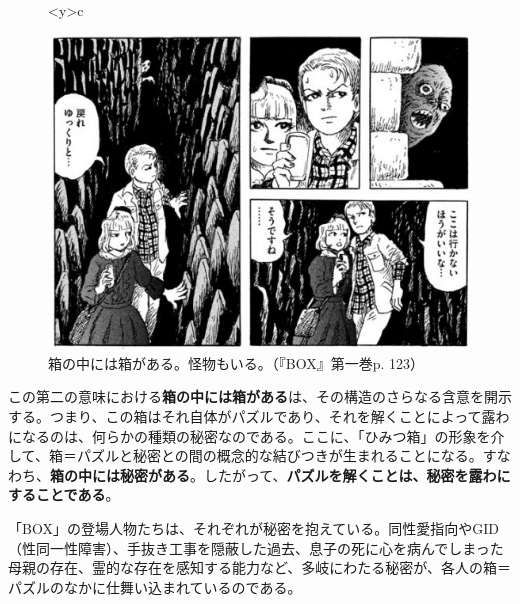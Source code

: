 \documentclass[b5j,twoside,twocolumn]{utarticle}
\begin{document}
\begin{figure}[h]
\begin{tabular}<y>{c}
\begin{minipage}[c]{0.7\hsize}
\centering
\includegraphics[scale=0.4]{箱と怪物}
\caption{箱の中には箱がある。怪物もいる。（『BOX』第一巻p. 123）}
\end{minipage}
\end{tabular}
\end{figure}

この第二の意味における\textbf{箱の中には箱がある}は、その構造のさらなる含意を開示する。つまり、この箱はそれ自体がパズルであり、それを解くことによって露わになるのは、何らかの種類の秘密なのである。ここに、「ひみつ箱」の形象を介して、箱＝パズルと秘密との間の概念的な結びつきが生まれることになる。すなわち、\textbf{箱の中には秘密がある}。したがって、\textbf{パズルを解くことは、秘密を露わにすることである}。

「BOX」の登場人物たちは、それぞれが秘密を抱えている。同性愛指向やGID（性同一性障害）、手抜き工事を隠蔽した過去、息子の死に心を病んでしまった母親の存在、霊的な存在を感知する能力など、多岐にわたる秘密が、各人の箱＝パズルのなかに仕舞い込まれているのである。
\end{document}
